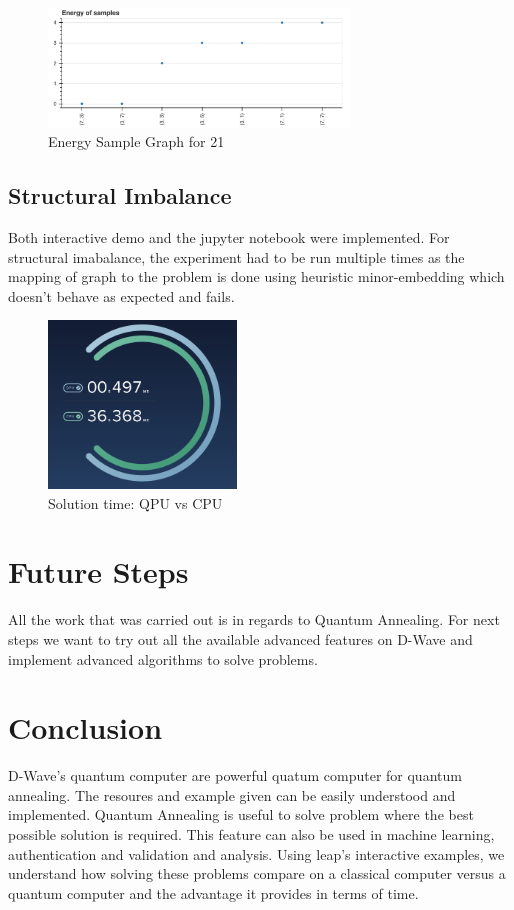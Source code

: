 \documentclass[12pt,conference]{IEEEtran}
\begin{document}
\begin{figure}[h]
  \centering
  \includegraphics[width=8cm]{esg.png}
  \caption{Energy Sample Graph for 21}
  \label{fig:ESG}
\end{figure}

\subsection{Structural Imbalance}
Both interactive demo and the jupyter notebook were implemented.
For structural imabalance, the experiment had to be run multiple times as the mapping of graph to the problem is done using heuristic minor-embedding which doesn't behave as expected and fails. 

\begin{figure}[h]
  \centering
  \includegraphics[width=5cm]{qpuvscpu.png}
  \caption{Solution time: QPU vs CPU}
  \label{fig:MCS}
\end{figure}


\section{Future Steps}
All the work that was carried out is in regards to Quantum Annealing. For next steps we want to try out all the available advanced features on D-Wave and implement advanced algorithms to solve problems. 

\section{Conclusion}
D-Wave's quantum computer are powerful quatum computer for quantum annealing. The resoures and example given can be easily understood and implemented. Quantum Annealing is useful to solve problem where the best possible solution is required. This feature can also be used in machine learning, authentication and validation and analysis. Using leap's interactive examples, we understand how solving these problems compare on a classical computer versus a quantum computer and the advantage it provides in terms of time. 
\end{document}
